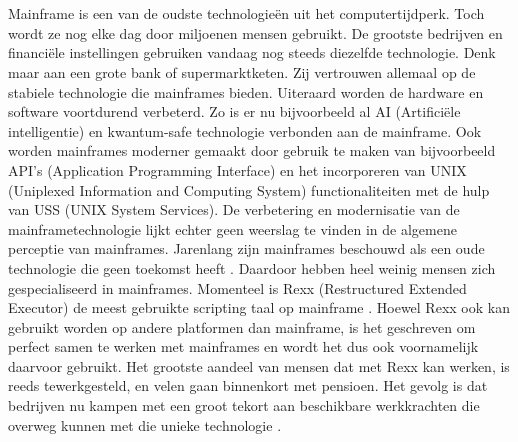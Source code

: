 
\chapter{}%
\label{ch:inleiding}



Mainframe is een van de oudste technologieën uit het computertijdperk. Toch wordt ze nog elke dag door miljoenen mensen gebruikt. De grootste bedrijven en financiële instellingen gebruiken vandaag nog steeds diezelfde technologie. Denk maar aan een grote bank of supermarktketen. Zij vertrouwen allemaal op de stabiele technologie die mainframes bieden. Uiteraard worden de hardware en software voortdurend verbeterd. Zo is er nu bijvoorbeeld al AI (Artificiële intelligentie) en kwantum-safe technologie verbonden aan de mainframe. Ook worden mainframes moderner gemaakt door gebruik te maken van bijvoorbeeld API's (Application Programming Interface) en het incorporeren van UNIX (Uniplexed Information and Computing System) functionaliteiten met de hulp van USS (UNIX System Services). De verbetering en modernisatie van de mainframetechnologie lijkt echter geen weerslag te vinden in de algemene perceptie van mainframes. Jarenlang zijn mainframes beschouwd als een oude technologie die geen toekomst heeft \autocite{Sagers2018}. Daardoor hebben heel weinig mensen zich gespecialiseerd in mainframes. Momenteel is Rexx (Restructured Extended Executor) de meest gebruikte scripting taal op mainframe \autocite{Gilio2021}. Hoewel Rexx ook kan gebruikt worden op andere platformen dan mainframe, is het geschreven om perfect samen te werken met mainframes en wordt het dus ook voornamelijk daarvoor gebruikt. Het grootste aandeel van mensen dat met Rexx kan werken, is reeds tewerkgesteld, en velen gaan binnenkort met pensioen. Het gevolg is dat bedrijven nu kampen met een groot tekort aan beschikbare werkkrachten die overweg kunnen met die unieke technologie \autocites{NgoYe2018}.

